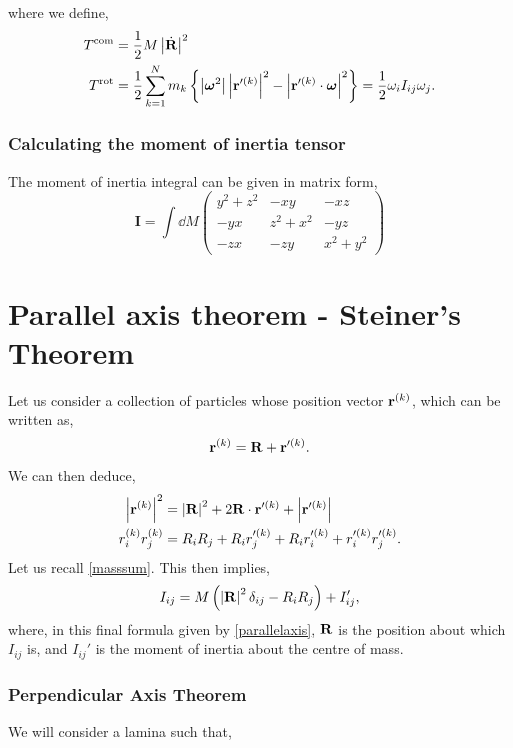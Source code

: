 \documentclass{book}
\begin{document}
where we define,
\begin{align}
    T^{\text{com}} & = \frac{1}{2}M\left|\Dot{\vb{R}}\right|^2 \\
    T^{\text{rot}} & = \frac{1}{2}\sum_{k=1}^Nm_k\left\{\left|\vb*{\omega}^2\right|\left|\vb{r}'^{(k)}\right|^2-\left|\vb{r}'^{(k)}\cdot\vb*{\omega}\right|^2\right\} = \frac{1}{2}\omega_iI_{ij}\omega_j.
\end{align}
\subsubsection{Calculating the moment of inertia tensor}
The moment of inertia integral can be given in matrix form,
\begin{equation}
    \mathbf{I} = \int \dd{M}\begin{pmatrix}
        y^2 + z^2 & -xy & -xz \\
        -yx & z^2 + x^2 & -yz \\
        -zx & -zy & x^2 + y^2
    \end{pmatrix}
\end{equation}
\section{Parallel axis theorem - Steiner's Theorem}
Let us consider a collection of particles whose position vector $\vb{r}^{(k)}$, which can be written as,
\begin{equation}
    \vb{r}^{(k)} = \vb{R} + \vb{r}'^{(k)}.
\end{equation}
We can then deduce,
\begin{align}
    \left|\vb{r}^{(k)}\right|^2 & =  \left|\vb{R}\right|^2 + 2\vb{R}\cdot\vb{r}'^{(k)} + \left|\vb{r}'^{(k)}\right| \\
    r_i^{(k)}r_j^{(k)} & = R_iR_j + R_ir'^{(k)}_j + R_ir'^{(k)}_i + r'^{(k)}_ir'^{(k)}_j.
\end{align}
Let us recall \eqref{masssum}. This then implies,
\begin{equation}
    I_{ij} = M\left(\left|\vb{R}\right|^2\delta_{ij}-R_iR_j\right) + I_{ij}', \label{parallelaxis}
\end{equation}
where, in this final formula given by \eqref{parallelaxis}, $\vb{R}$ is the position about which $I_{ij}$ is, and $I_{ij}'$ is the moment of inertia about the centre of mass.
\subsubsection{Perpendicular Axis Theorem}
We will consider a lamina such that,
\end{document}
